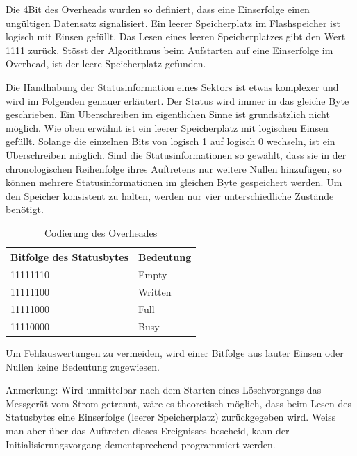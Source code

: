 Die 4Bit des Overheads wurden so definiert, dass eine Einserfolge einen ungültigen Datensatz signalisiert. Ein leerer Speicherplatz im Flashspeicher ist logisch mit Einsen gefüllt. Das Lesen eines leeren Speicherplatzes gibt den Wert  1111\grqq{}   zurück. Stösst der Algorithmus beim Aufstarten auf eine Einserfolge im Overhead, ist der leere Speicherplatz gefunden. 

Die Handhabung der Statusinformation eines Sektors ist etwas komplexer und wird im Folgenden genauer erläutert. Der Status wird immer in das gleiche Byte geschrieben. Ein Überschreiben im eigentlichen Sinne ist grundsätzlich nicht möglich. Wie oben erwähnt ist ein leerer Speicherplatz mit logischen Einsen gefüllt. Solange die einzelnen Bits von logisch 1 auf logisch 0 wechseln, ist ein Überschreiben möglich. Sind die Statusinformationen so gewählt, dass sie in der chronologischen Reihenfolge ihres Auftretens nur weitere Nullen hinzufügen, so können mehrere Statusinformationen im gleichen Byte gespeichert werden. Um den Speicher konsistent zu halten, werden nur vier unterschiedliche Zustände benötigt.

\begin{table}[H]
\begin{center}
\begin{tabular}{|l|l|}
\hline
Bitfolge des Statusbytes & Bedeutung \\ \hline
11111110                 & Empty     \\ \hline
11111100                 & Written   \\ \hline
11111000                 & Full      \\ \hline
11110000                 & Busy      \\ \hline
\end{tabular}
\caption{Codierung des Overheades}
\label{tab:Codierung_des_Overheades}
\end{center}
\end{table}

Um Fehlauswertungen zu vermeiden, wird einer Bitfolge aus lauter Einsen oder Nullen keine Bedeutung zugewiesen. 

Anmerkung: Wird unmittelbar nach dem Starten eines Löschvorgangs das Messgerät vom Strom getrennt, wäre es theoretisch möglich, dass beim Lesen des Statusbytes eine Einserfolge (leerer Speicherplatz) zurückgegeben wird. Weiss man aber über das Auftreten dieses Ereignisses bescheid, kann der Initialisierungsvorgang dementsprechend programmiert werden.

